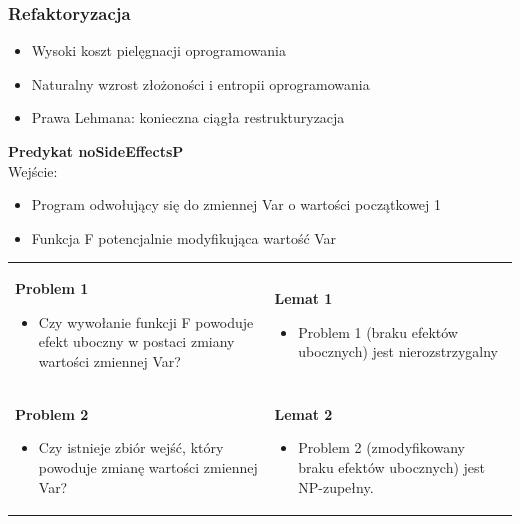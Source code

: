 \documentclass[a4paper]{article}
\begin{document}
    \subsubsection{Refaktoryzacja}
    \begin{itemize}
        \item Wysoki koszt pielęgnacji oprogramowania
        \item Naturalny wzrost złożoności i entropii
        oprogramowania
        \item Prawa Lehmana: konieczna ciągła restrukturyzacja
    \end{itemize}

    \textbf{Predykat noSideEffectsP}\\
    Wejście:
    \begin{itemize}
        \item Program odwołujący się do zmiennej Var o wartości początkowej 1
        \item Funkcja F potencjalnie modyfikująca wartość Var
    \end{itemize}


    \begin{table}[H]
        \begin{center}
            \begin{tabular}{ p{8cm} p{8cm} }
                \textbf{Problem 1}
                \begin{itemize}
                    \item Czy wywołanie funkcji F powoduje efekt uboczny w
                    postaci zmiany wartości zmiennej Var?
                \end{itemize}
                &
                \textbf{Lemat 1}
                \begin{itemize}
                    \item Problem 1 (braku efektów ubocznych) jest
                    nierozstrzygalny
                \end{itemize}
                \\

                \textbf{Problem 2}
                \begin{itemize}
                    \item Czy istnieje zbiór wejść, który powoduje zmianę
                    wartości zmiennej Var?
                \end{itemize}
                &
                \textbf{Lemat 2}
                \begin{itemize}
                    \item Problem 2 (zmodyfikowany braku efektów
                    ubocznych) jest NP-zupełny.
                \end{itemize}
                \\
            \end{tabular}
        \end{center}
    \end{table}
\end{document}

